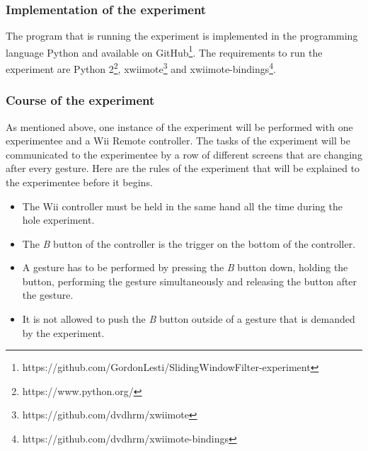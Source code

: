 \documentclass[runningheads,a4paper]{llncs}
\begin{document}
    \subsubsection{Implementation of the experiment}
    The program that is running the experiment is implemented in the programming language Python and available on
    GitHub\footnote{https://github.com/GordonLesti/SlidingWindowFilter-experiment}. The requirements to run the
    experiment are Python 2\footnote{https://www.python.org/}, xwiimote\footnote{https://github.com/dvdhrm/xwiimote} and
    xwiimote-bindings\footnote{https://github.com/dvdhrm/xwiimote-bindings}.

    \subsubsection{Course of the experiment}
    As mentioned above, one instance of the experiment will be performed with one experimentee and a Wii Remote
    controller. The tasks of the experiment will be communicated to the experimentee by a row of different screens that
    are changing after every gesture. Here are the rules of the experiment that will be explained to the experimentee
    before it begins.
    \begin{itemize}
        \item The Wii controller must be held in the same hand all the time during the hole experiment.
        \item The \textit{B} button of the controller is the trigger on the bottom of the controller.
        \item A gesture has to be performed by pressing the \textit{B} button down, holding the button, performing the
        gesture simultaneously and releasing the button after the gesture.
        \item It is not allowed to push the \textit{B} button outside of a gesture that is demanded by the experiment.
    \end{itemize}
\end{document}

